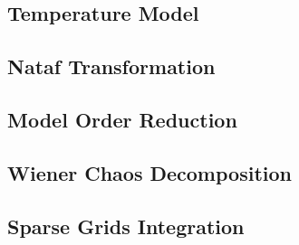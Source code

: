 \subsection{Temperature Model} 

\subsection{Nataf Transformation} 

\subsection{Model Order Reduction} 

\subsection{Wiener Chaos Decomposition} 


\subsection{Sparse Grids Integration} 

